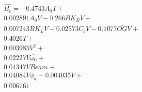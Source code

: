 \begin{equation} \label{eq:polynom_complex}
\begin{aligned} 
 \hat{B_{e}} = - 0.4743 A_{0} T + \\ 
 0.002891 A_{0} V - 0.266 BK_{B} V + \\ 
 0.007243 BK_{L} V - 0.02573 C_{b} V - 0.1077 \overline{OG} V + \\ 
 0.4026 T + \\ 
 0.003985 V^{2} + \\ 
 0.02227 V \hat{\omega_0} + \\ 
 0.04347 V Beam + \\ 
 0.04084 V \phi_{a} - 0.004035 V + \\ 
 0.006761 \\ 
 \end{aligned}
\end{equation}
